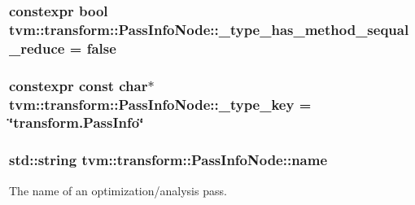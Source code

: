 \subsubsection[{\texorpdfstring{\+\_\+type\+\_\+has\+\_\+method\+\_\+sequal\+\_\+reduce}{_type_has_method_sequal_reduce}}]{\setlength{\rightskip}{0pt plus 5cm}constexpr bool tvm\+::transform\+::\+Pass\+Info\+Node\+::\+\_\+type\+\_\+has\+\_\+method\+\_\+sequal\+\_\+reduce = false\hspace{0.3cm}{\ttfamily [static]}}\hypertarget{classtvm_1_1transform_1_1PassInfoNode_a41087cffcece669d267f137ad30a5404}{}\label{classtvm_1_1transform_1_1PassInfoNode_a41087cffcece669d267f137ad30a5404}
\subsubsection[{\texorpdfstring{\+\_\+type\+\_\+key}{_type_key}}]{\setlength{\rightskip}{0pt plus 5cm}constexpr const char$\ast$ tvm\+::transform\+::\+Pass\+Info\+Node\+::\+\_\+type\+\_\+key = \char`\"{}transform.\+Pass\+Info\char`\"{}\hspace{0.3cm}{\ttfamily [static]}}\hypertarget{classtvm_1_1transform_1_1PassInfoNode_a78c9eca9534883355d96eb0cd1fb8816}{}\label{classtvm_1_1transform_1_1PassInfoNode_a78c9eca9534883355d96eb0cd1fb8816}
\subsubsection[{\texorpdfstring{name}{name}}]{\setlength{\rightskip}{0pt plus 5cm}std\+::string tvm\+::transform\+::\+Pass\+Info\+Node\+::name}\hypertarget{classtvm_1_1transform_1_1PassInfoNode_a29ef9f45e08c32e691cef46eb858dbe7}{}\label{classtvm_1_1transform_1_1PassInfoNode_a29ef9f45e08c32e691cef46eb858dbe7}


The name of an optimization/analysis pass. 

